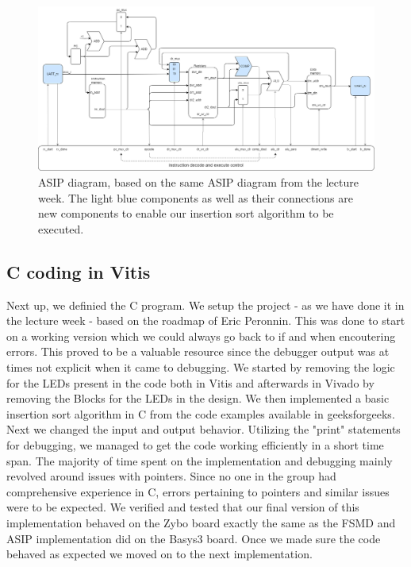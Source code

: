 \documentclass[conference]{IEEEtran}
\begin{document}
\begin{figure}
    \centering
    \includegraphics[width=1\linewidth]{Images/ASIP.png}
    \caption{ASIP diagram, based on the same ASIP diagram from the lecture week. The light blue components as well as their connections are new components to enable our insertion sort algorithm to be executed.}\label{fig:asip}
\end{figure}

\subsection{C coding in Vitis}
Next up, we definied the C program. We setup the project - as we have done it in the lecture week - based on the roadmap of Eric Peronnin. This was done to start on a working version which we could always go back to if and when encoutering errors. This proved to be a valuable resource since the debugger output was at times not explicit when it came to debugging. We started by removing the logic for the LEDs present in the code both in Vitis and afterwards in Vivado by removing the Blocks for the LEDs in the design. We then implemented a basic insertion sort algorithm in C from the code examples available in geeksforgeeks\cite{g4g}. Next we changed the input and output behavior. Utilizing the "print" statements for debugging, we managed to get the code working efficiently in a short time span. The majority of time spent on the implementation and debugging mainly revolved around issues with pointers. Since no one in the group had comprehensive experience in C, errors pertaining to pointers and similar issues were to be expected. We verified and tested that our final version of this implementation behaved on the Zybo board exactly the same as the FSMD and ASIP implementation did on the Basys3 board. Once we made sure the code behaved as expected we moved on to the next implementation.
\end{document}

